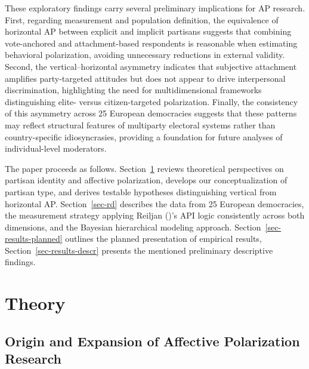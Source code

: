 \documentclass[
  12pt,
  a4paper,
  DIV=11,
  numbers=noendperiod]{scrartcl}
\begin{document}
These exploratory findings carry several preliminary implications for AP
research. First, regarding measurement and population definition, the
equivalence of horizontal AP between explicit and implicit partisans
suggests that combining vote-anchored and attachment-based respondents
is reasonable when estimating behavioral polarization, avoiding
unnecessary reductions in external validity. Second, the
vertical--horizontal asymmetry indicates that subjective attachment
amplifies party-targeted attitudes but does not appear to drive
interpersonal discrimination, highlighting the need for multidimensional
frameworks distinguishing elite- versus citizen-targeted polarization.
Finally, the consistency of this asymmetry across 25 European
democracies suggests that these patterns may reflect structural features
of multiparty electoral systems rather than country-specific
idiosyncrasies, providing a foundation for future analyses of
individual-level moderators.

The paper proceeds as follows. Section~\ref{sec-theory} reviews
theoretical perspectives on partisan identity and affective
polarization, develops our conceptualization of partisan type, and
derives testable hypotheses distinguishing vertical from horizontal AP.
Section~\ref{sec-rd} describes the data from 25 European democracies,
the measurement strategy applying Reiljan
()'s API logic consistently across
both dimensions, and the Bayesian hierarchical modeling approach.
Section~\ref{sec-results-planned} outlines the planned presentation of
empirical results, Section~\ref{sec-results-descr} presents the
mentioned preliminary descriptive findings.

\section{Theory}\label{sec-theory}

\subsection{Origin and Expansion of Affective Polarization
Research}\label{sec-origins}
\end{document}

